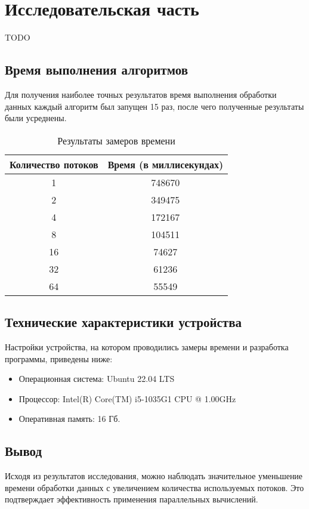 \chapter{Исследовательская часть}
TODO

\section{Время выполнения алгоритмов}
Для получения наиболее точных результатов время выполнения обработки данных каждый алгоритм был запущен 15 раз, после чего полученные результаты были усреднены.

\begin{table}[h]
	\begin{center}
		\begin{threeparttable}
			\captionsetup{justification=raggedright,singlelinecheck=off}
			\caption{\label{tbl:time_res}Результаты замеров времени}
			\begin{tabular}{|c|c|}
				\hline
				Количество потоков &Время (в миллисекундах)\\
				\hline
				1 & 748670\\ 
				\hline
				2 & 349475\\  
				\hline
				4 & 172167\\  
				\hline
				8 & 104511\\ 
				\hline
				16 & 74627\\ 
				\hline
				32 & 61236\\ 
				\hline
				64 & 55549\\ 
				\hline
			\end{tabular}
		\end{threeparttable}
	\end{center}
\end{table}

\FloatBarrier

\section{Технические характеристики устройства}

Настройки устройства, на котором проводились замеры времени и разработка программы, приведены ниже:

\begin{itemize}
	\item Операционная система: Ubuntu 22.04 LTS
	\item Процессор: Intel(R) Core(TM) i5-1035G1 CPU @ 1.00GHz
	\item Оперативная память: 16 Гб.
\end{itemize}

\section{Вывод}
Исходя из результатов исследования, можно наблюдать значительное уменьшение времени обработки данных с увеличением количества используемых потоков. Это подтверждает эффективность применения параллельных вычислений.
